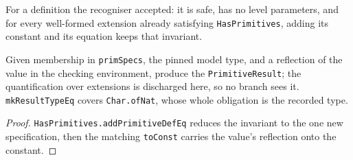 \begin{definition}
\label{vpc:struct:primitiveresult}\leanok
{}

 For a definition the recogniser accepted: it is safe, has no level parameters, and
for every well-formed extension already satisfying \texttt{HasPrimitives}, adding its constant
and its equation keeps that invariant.
\end{definition}

\begin{theorem}
\label{vpc:thm:data-mkresult}
\leanok
{}

 Given membership in \texttt{primSpecs}, the pinned model type, and a reflection
of the value in the checking environment, produce the \texttt{PrimitiveResult}; the
quantification over extensions is discharged here, so no branch sees it.
\texttt{mkResultTypeEq} covers \texttt{Char.ofNat}, whose whole obligation is the recorded
type.
\end{theorem}
\begin{proof}\leanok
{}
 \texttt{HasPrimitives.addPrimitiveDefEq} reduces the invariant to the one new
specification, then the matching \texttt{toConst} carries the value's reflection onto the
constant.
\end{proof}

